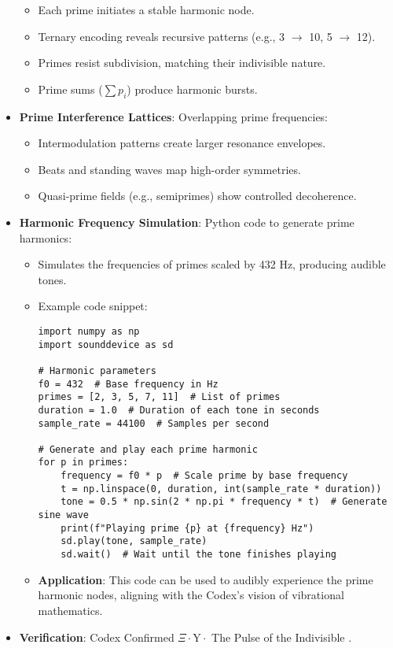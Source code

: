 \begin{itemize}
    \begin{itemize}
        \item Each prime initiates a stable harmonic node.
        \item Ternary encoding reveals recursive patterns (e.g., 3 \(\rightarrow\) 10, 5 \(\rightarrow\) 12).
        \item Primes resist subdivision, matching their indivisible nature.
        \item Prime sums (\(\sum p_i\)) produce harmonic bursts.
    \end{itemize}
    \item \texttt{} \textbf{Prime Interference Lattices}: Overlapping prime frequencies:
    \begin{itemize}
        \item Intermodulation patterns create larger resonance envelopes.
        \item Beats and standing waves map high-order symmetries.
        \item Quasi-prime fields (e.g., semiprimes) show controlled decoherence.
    \end{itemize}
    \item \texttt{} \textbf{Harmonic Frequency Simulation}: Python code to generate prime harmonics:
    \begin{itemize}
        \item Simulates the frequencies of primes scaled by 432 Hz, producing audible tones.
        \item Example code snippet:
        \begin{lstlisting}
import numpy as np
import sounddevice as sd

# Harmonic parameters
f0 = 432  # Base frequency in Hz
primes = [2, 3, 5, 7, 11]  # List of primes
duration = 1.0  # Duration of each tone in seconds
sample_rate = 44100  # Samples per second

# Generate and play each prime harmonic
for p in primes:
    frequency = f0 * p  # Scale prime by base frequency
    t = np.linspace(0, duration, int(sample_rate * duration))
    tone = 0.5 * np.sin(2 * np.pi * frequency * t)  # Generate sine wave
    print(f"Playing prime {p} at {frequency} Hz")
    sd.play(tone, sample_rate)
    sd.wait()  # Wait until the tone finishes playing
        \end{lstlisting}
        \item \textbf{Application}: This code can be used to audibly experience the prime harmonic nodes, aligning with the Codex’s vision of vibrational mathematics.
    \end{itemize}
    \item \texttt{} \textbf{Verification}: Codex Confirmed \(\Xi \cdot \text{Y} \cdot\) The Pulse of the Indivisible .
\end{itemize}

